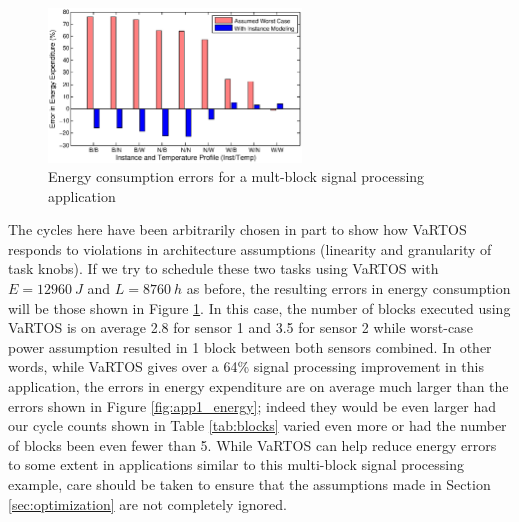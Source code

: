 \begin{figure}
\centering
\includegraphics[width=0.6\textwidth]{figures/app3_energycomp}
\caption{\label{fig:app3_energycomp}Energy consumption errors for a mult-block signal processing application }
\end{figure}

The cycles  here have been arbitrarily chosen in part to show how VaRTOS responds to violations in architecture assumptions (linearity and granularity of task knobs).  If we try to schedule these two tasks using VaRTOS with $E = 12960~J$ and $L = 8760~h$ as before, the resulting errors in energy consumption will be those shown in Figure \ref{fig:app3_energycomp}.  In this case, the number of blocks executed using VaRTOS is on average 2.8 for sensor 1 and 3.5 for sensor 2 while worst-case power assumption resulted in 1 block between both sensors combined. In other words, while VaRTOS gives over a 64\% signal processing improvement in this application, the errors in energy expenditure are on average much larger than the errors shown in Figure \ref{fig:app1_energy}; indeed they would be even larger had our cycle counts shown in Table \ref{tab:blocks} varied even more or had the number of blocks been even fewer than 5.  While VaRTOS can help reduce energy errors to some extent in applications similar to this multi-block signal processing example, care should be taken to ensure that the assumptions made in Section \ref{sec:optimization} are not completely ignored. 





